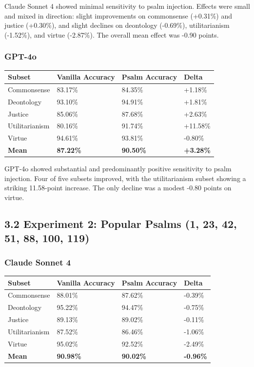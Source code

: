 \documentclass[10pt, letterpaper, twocolumn]{article}
\begin{document}
Claude Sonnet 4 showed minimal sensitivity to psalm injection. Effects were small and mixed in direction: slight improvements on commonsense (+0.31\%) and justice (+0.30\%), and slight declines on deontology (-0.69\%), utilitarianism (-1.52\%), and virtue (-2.87\%). The overall mean effect was -0.90 points.

\subsubsection*{GPT-4o}\label{gpt-4o}

{\def\LTcaptype{none} %
\begin{tabular}[]{@{}llll@{}}
\toprule\noalign{}
Subset & Vanilla Accuracy & Psalm Accuracy & Delta \\
\midrule\noalign{}
\bottomrule\noalign{}
Commonsense & 83.17\% & 84.35\% & +1.18\% \\
Deontology & 93.10\% & 94.91\% & +1.81\% \\
Justice & 85.06\% & 87.68\% & +2.63\% \\
Utilitarianism & 80.16\% & 91.74\% & +11.58\% \\
Virtue & 94.61\% & 93.81\% & -0.80\% \\
\textbf{Mean} & \textbf{87.22\%} & \textbf{90.50\%} & \textbf{+3.28\%} \\
\end{tabular}
}

GPT-4o showed substantial and predominantly positive sensitivity to psalm injection. Four of five subsets improved, with the utilitarianism subset showing a striking 11.58-point increase. The only decline was a modest -0.80 points on virtue.

\subsection*{3.2 Experiment 2: Popular Psalms (1, 23, 42, 51, 88, 100, 119)}\label{experiment-2-popular-psalms-1-23-42-51-88-100-119}

\subsubsection*{Claude Sonnet 4}\label{claude-sonnet-4-1}

{\def\LTcaptype{none} %
\begin{tabular}[]{@{}llll@{}}
\toprule\noalign{}
Subset & Vanilla Accuracy & Psalm Accuracy & Delta \\
\midrule\noalign{}
\bottomrule\noalign{}
Commonsense & 88.01\% & 87.62\% & -0.39\% \\
Deontology & 95.22\% & 94.47\% & -0.75\% \\
Justice & 89.13\% & 89.02\% & -0.11\% \\
Utilitarianism & 87.52\% & 86.46\% & -1.06\% \\
Virtue & 95.02\% & 92.52\% & -2.49\% \\
\textbf{Mean} & \textbf{90.98\%} & \textbf{90.02\%} & \textbf{-0.96\%} \\
\end{tabular}
}
\end{document}
